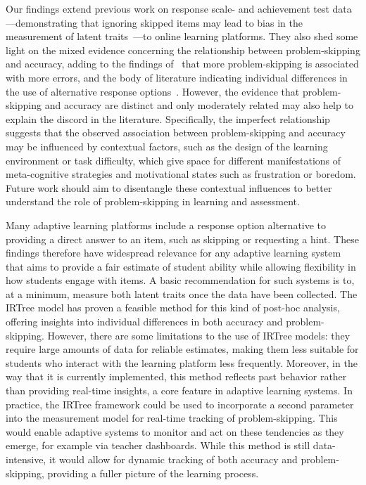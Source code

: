 \documentclass[11pt]{article}
\begin{document}
Our findings extend previous work on response scale- and achievement test data---demonstrating that ignoring skipped items may lead to bias in the measurement of latent traits~\parencite{holman2005modelling, pohl2014dealing, huang2020mixture, okumura2014empirical, debeer2017modeling}---to online learning platforms. They also shed some light on the mixed evidence concerning the relationship between problem-skipping and accuracy, adding to the findings of~\textcite{norum2024student} that more problem-skipping is associated with more errors, and the body of literature indicating individual differences in the use of alternative response options~\parencite{norum2024student, goldin2012learner, goldin2013hints}. However, the evidence that problem-skipping and accuracy are distinct and only moderately related may also help to explain the discord in the literature. Specifically, the imperfect relationship suggests that the observed association between problem-skipping and accuracy may be influenced by contextual factors, such as the design of the learning environment or task difficulty, which give space for different manifestations of meta-cognitive strategies and motivational states such as frustration or boredom. Future work should aim to disentangle these contextual influences to better understand the role of problem-skipping in learning and assessment. 

Many adaptive learning platforms include a response option alternative to providing a direct answer to an item, such as skipping or requesting a hint. These findings therefore have widespread relevance for any adaptive learning system that aims to provide a fair estimate of student ability while allowing flexibility in how students engage with items. A basic recommendation for such systems is to, at a minimum, measure both latent traits once the data have been collected. The IRTree model has proven a feasible method for this kind of post-hoc analysis, offering insights into individual differences in both accuracy and problem-skipping. However, there are some limitations to the use of IRTree models: they require large amounts of data for reliable estimates, making them less suitable for students who interact with the learning platform less frequently. Moreover, in the way that it is currently implemented, this method reflects past behavior rather than providing real-time insights, a core feature in adaptive learning systems. In practice, the IRTree framework could be used to incorporate a second parameter into the measurement model for real-time tracking of problem-skipping. This would enable adaptive systems to monitor and act on these tendencies as they emerge, for example via teacher dashboards. While this method is still data-intensive, it would allow for dynamic tracking of both accuracy and problem-skipping, providing a fuller picture of the learning process. 
\end{document}
